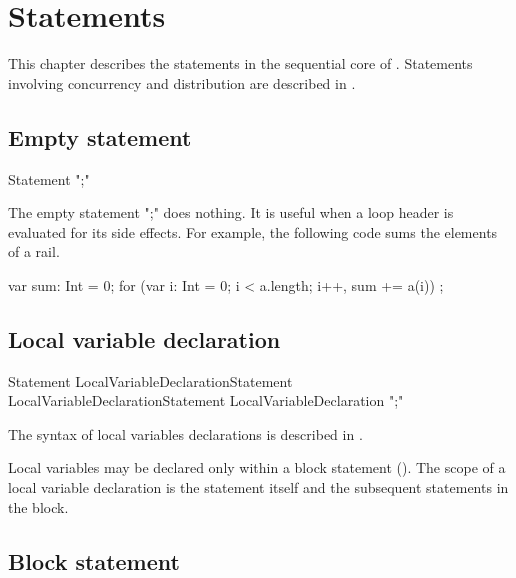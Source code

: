 \chapter{Statements}\label{XtenStatements}

This chapter describes the statements in the sequential core of
\Xten{}.  Statements involving concurrency and distribution
are described in .

\section{Empty statement}

\begin{grammar}
Statement \: \xcd";" \\
\end{grammar}

The empty statement \xcd";" does nothing.  It is useful when a
loop header is evaluated for its side effects.  For example,
the following code sums the elements of a rail.

\begin{xten}
var sum: Int = 0;
for (var i: Int = 0; i < a.length; i++, sum += a(i))
    ;
\end{xten}

\section{Local variable declaration}

\begin{grammar}
Statement \: LocalVariableDeclarationStatement \\
             LocalVariableDeclarationStatement \:
             LocalVariableDeclaration \xcd";" \\
\end{grammar}

The syntax of local variables declarations is described in
.

Local variables may be declared only within a block statement
().
The scope of a local variable declaration is the 
statement itself and the subsequent statements in the block.

\section{Block statement}
\label{Blocks}

